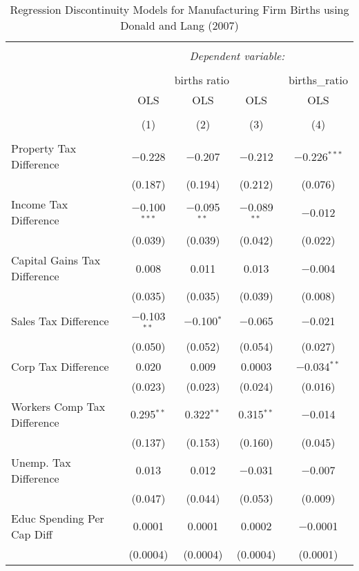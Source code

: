 
\begin{table}[!htbp] \centering 
  \caption{Regression Discontinuity Models for  Manufacturing Firm Births using Donald and Lang (2007)} 
  \label{} 
\begin{tabular}{@{\extracolsep{5pt}}lcccc} 
\\[-1.8ex]\hline 
\hline \\[-1.8ex] 
 & \multicolumn{4}{c}{\textit{Dependent variable:}} \\ 
\cline{2-5} 
\\[-1.8ex] & \multicolumn{3}{c}{births ratio} & births\_ratio \\ 
 & OLS & OLS & OLS & OLS \\ 
\\[-1.8ex] & (1) & (2) & (3) & (4)\\ 
\hline \\[-1.8ex] 
 Property Tax Difference & $-$0.228 & $-$0.207 & $-$0.212 & $-$0.226$^{***}$ \\ 
  & (0.187) & (0.194) & (0.212) & (0.076) \\ 
  Income Tax Difference & $-$0.100$^{***}$ & $-$0.095$^{**}$ & $-$0.089$^{**}$ & $-$0.012 \\ 
  & (0.039) & (0.039) & (0.042) & (0.022) \\ 
  Capital Gains Tax Difference & 0.008 & 0.011 & 0.013 & $-$0.004 \\ 
  & (0.035) & (0.035) & (0.039) & (0.008) \\ 
  Sales Tax Difference & $-$0.103$^{**}$ & $-$0.100$^{*}$ & $-$0.065 & $-$0.021 \\ 
  & (0.050) & (0.052) & (0.054) & (0.027) \\ 
  Corp Tax Difference & 0.020 & 0.009 & 0.0003 & $-$0.034$^{**}$ \\ 
  & (0.023) & (0.023) & (0.024) & (0.016) \\ 
  Workers Comp Tax Difference & 0.295$^{**}$ & 0.322$^{**}$ & 0.315$^{**}$ & $-$0.014 \\ 
  & (0.137) & (0.153) & (0.160) & (0.045) \\ 
  Unemp. Tax Difference & 0.013 & 0.012 & $-$0.031 & $-$0.007 \\ 
  & (0.047) & (0.044) & (0.053) & (0.009) \\ 
  Educ Spending Per Cap Diff & 0.0001 & 0.0001 & 0.0002 & $-$0.0001 \\ 
  & (0.0004) & (0.0004) & (0.0004) & (0.0001) \\ 

\end{tabular}
\end{table}
